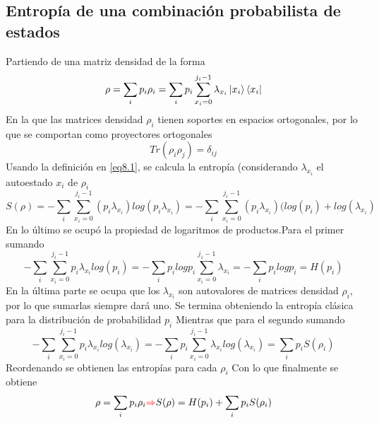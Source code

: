 \documentclass{book}
\begin{document}
    \subsection{{Entropía de una combinación probabilista de estados}} Partiendo de una matriz densidad de la forma
    \begin{equation}\label{eq8.18}{\rho=\sum_i p_i\rho_i=\sum_{i}p_i\sum_{x_i=0}^{j_i-1}\lambda_{x_i} \ket{x_i}\bra{x_i} }\end{equation}
    En la que las matrices densidad $\rho_i$ tienen soportes en espacios ortogonales, por lo que se comportan como proyectores ortogonales
    \begin{equation}\label{eq8.19}{ Tr(\rho_i\rho_j)=\delta_{ij} }\end{equation}
    Usando la definición en \ref{eq8.1}, se calcula la entropía (considerando $\lambda_{x_i}$ el autoestado $x_i$ de $\rho_i$
    \begin{equation}\label{eq8.20}{ S(\rho)=-\sum_{i}\sum_{x_i=0}^{j_i-1}(p_i\lambda_{x_i})log(p_i\lambda_{x_i})=-\sum_{i}\sum_{x_i=0}^{j_i-1}(p_i\lambda_{x_i})(log(p_i)+log(\lambda_{x_i}) }\end{equation}
    En lo último se ocupó la propiedad de logaritmos de productos.Para el primer sumando
    \begin{equation}\label{eq8.21}{ -\sum_i\sum_{x_i=0}^{j_i-1}p_i\lambda_{x_i}log(p_i)=-\sum_ip_ilogp_i\sum_{x_i=0}^{j_1-1}\lambda_{x_i}=-\sum_ip_i logp_i=H(p_i)}\end{equation}
    En la última parte se ocupa que los $\lambda_{x_i}$ son autovalores de matrices densidad $\rho_i$, por lo que sumarlas siempre dará uno. Se termina obteniendo la entropía clásica para la distribución de probabilidad $p_i$ Mientras que para el segundo sumando
    \begin{equation}\label{eq8.22}{-\sum_i\sum_{x_i=0}^{j_i-1}p_i\lambda_{x_i}log(\lambda_{x_i})=-\sum_i p_i\sum_{x_i=0}^{j_i-1}\lambda_{x_i}log(\lambda_{x_i})=\sum_i p_i S(\rho_i)}\end{equation}
    Reordenando se obtienen las entropías para cada $\rho_i$ Con lo que finalmente se obtiene
    \begin{equation}\label{eq8.23}{\rho=\sum_i p_i\rho_i \textcolor{red}{\Rightarrow} S(\rho)=H(p_i)+\sum_i p_i S(\rho_i)}\end{equation}
\end{document}
